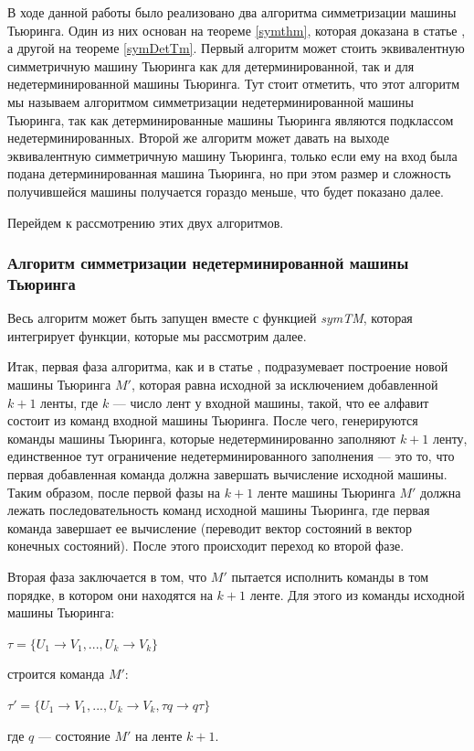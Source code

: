 \documentclass[14pt]{matmex-diploma-custom}
\begin{document}
В ходе данной работы было реализовано два алгоритма симметризации машины Тьюринга. Один из них основан на теореме \ref{symthm}, которая доказана в статье \cite{Sapir}, а другой на теореме \ref{symDetTm}. Первый алгоритм может стоить эквивалентную симметричную машину Тьюринга как для детерминированной, так и для недетерминированной машины Тьюринга. Тут стоит отметить, что этот алгоритм мы называем алгоритмом симметризации недетерминированной машины Тьюринга, так как детерминированные машины Тьюринга являются подклассом недетерминированных. Второй же алгоритм может давать на выходе эквивалентную симметричную машину Тьюринга, только если ему на вход была подана детерминированная машина Тьюринга, но при этом размер и сложность получившейся машины получается гораздо меньше, что будет показано далее.

Перейдем к рассмотрению этих двух алгоритмов.

\subsubsection{Алгоритм симметризации недетерминированной машины Тьюринга}
Весь алгоритм может быть запущен вместе с функцией \textit{symTM}, которая интегрирует функции, которые мы рассмотрим далее.

Итак, первая фаза алгоритма, как и в статье \cite{Sapir}, подразумевает построение новой машины Тьюринга $M'$, которая равна исходной за исключением добавленной $k+1$ ленты, где $k$ --- число лент у входной машины, такой, что ее алфавит состоит из команд входной машины Тьюринга. После чего, генерируются команды машины Тьюринга, которые недетерминированно заполняют $k+1$ ленту, единственное тут ограничение недетерминированного заполнения --- это то, что первая добавленная команда должна завершать вычисление исходной машины. Таким образом, после первой фазы на $k+1$ ленте машины Тьюринга $M'$ должна лежать последовательность команд исходной машины Тьюринга, где первая команда завершает ее вычисление (переводит вектор состояний в вектор конечных состояний). После этого происходит переход ко второй фазе. 

Вторая фаза заключается в том, что $M'$ пытается исполнить команды в том порядке, в котором они находятся на $k+1$ ленте. Для этого из команды исходной машины Тьюринга:
\begin{center}
    $\tau = \{ U_1 \to V_1, ... , U_k \to V_k \}$
\end{center}
строится команда $M'$:
\begin{center}
    $\tau' = \{ U_1 \to V_1, ... , U_k \to V_k, \tau q \to q \tau \}$
\end{center}
где $q$ --- состояние $M'$ на ленте $k+1$. 
\end{document}
